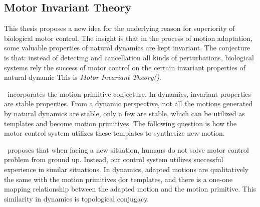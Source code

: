 \subsection{Motor Invariant Theory}
%
%
%





This thesis proposes a new idea for the underlying reason for superiority of biological motor control.
The insight is that in the process of motion adaptation, some valuable properties of natural dynamics are kept invariant.
The conjecture is that:  instead of detecting and cancellation all kinds of perturbations, biological systems rely the success of motor control on the certain invariant properties of natural dynamic 
This is \emph{Motor Invariant Theory({\moit})}.


{\moit}\ incorporates the motion primitive conjecture.
In dynamics, invariant properties are stable properties.
From a dynamic perspective, not all the motions generated by natural dynamics are stable, only a few are stable, which can be utilized as templates and become motion primitives.
The following question is how the motor control system utilizes these templates to synthesize new motion.

{\moit}\ proposes that when facing a new situation, humans do not solve motor control problem from ground up.
Instead, our control system utilizes successful experience in similar situations.
In dynamics, adapted motions are qualitatively the same with the motion primitives dor templates, and there is a one-one mapping relationship between the adapted motion and the motion primitive.
This similarity in dynamics is topological conjugacy. 

